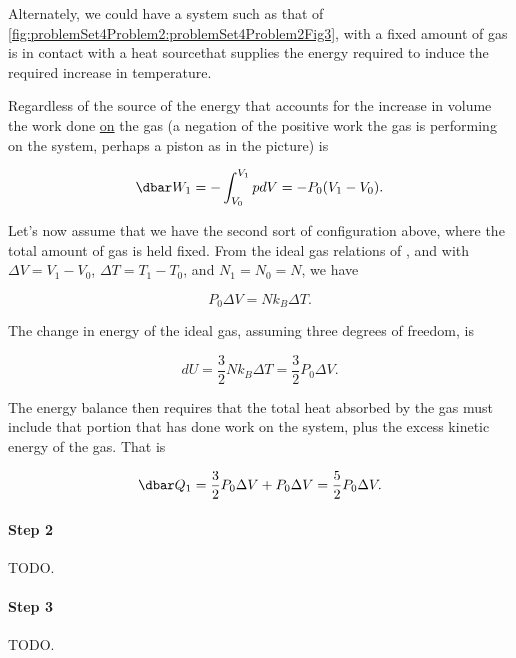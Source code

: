 {Alternately, we could have a system such as that of \cref{fig:problemSet4Problem2:problemSet4Problem2Fig3}, with a fixed amount of gas is in contact with a heat sourcethat supplies the energy required to induce the required increase in temperature.


Regardless of the source of the energy that accounts for the increase in volume the work done \underline{on} the gas (a negation of the positive work the gas is performing on the system, perhaps a piston as in the picture) is

\begin{equation}\label{eqn:basicStatMechProblemSet4Problem2:60}
\dbar W_1 = - \int_{V_0}^{V_1} p dV = -P_0 (V_1 - V_0).
\end{equation}

Let's now assume that we have the second sort of configuration above, where the total amount of gas is held fixed.  From the ideal gas relations of , and with $\Delta V = V_1 - V_0$, $\Delta T = T_1 - T_0$, and $N_1 = N_0 = N$, we have

\begin{equation}\label{eqn:basicStatMechProblemSet4Problem2:80}
P_0 \Delta V = N k_B \Delta T.
\end{equation}

The change in energy of the ideal gas, assuming three degrees of freedom, is

\begin{equation}\label{eqn:basicStatMechProblemSet4Problem2:100}
d U = \frac{3}{2} N k_B \Delta T = \frac{3}{2} P_0 \Delta V.
\end{equation}

The energy balance then requires that the total heat absorbed by the gas must include that portion that has done work on the system, plus the excess kinetic energy of the gas.  That is

\begin{equation}\label{eqn:basicStatMechProblemSet4Problem2:120}
\dbar Q_1 = \frac{3}{2} P_0 \Delta V + P_0 \Delta V = \frac{5}{2} P_0 \Delta V.
\end{equation}

\paragraph{Step 2}
TODO.
\paragraph{Step 3}
TODO.
}
